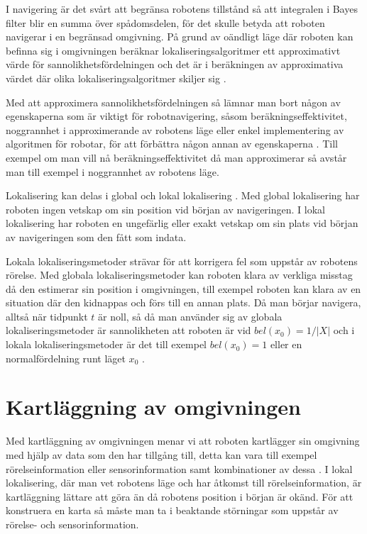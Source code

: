 I navigering är det svårt att begränsa robotens tillstånd så att integralen i Bayes filter blir en summa över spådomsdelen, för det skulle betyda att roboten navigerar i en begränsad omgivning. På grund av oändligt läge där roboten kan befinna sig i omgivningen beräknar lokaliseringsalgoritmer ett approximativt värde för sannolikhetsfördelningen och det är i beräkningen av approximativa värdet där olika lokaliseringsalgoritmer skiljer sig \citep{ProbabilisticRobotics}.

Med att approximera sannolikhetsfördelningen så lämnar man bort någon av egenskaperna som är viktigt för robotnavigering, såsom beräkningseffektivitet, noggrannhet i approximerande av robotens läge eller enkel implementering av algoritmen för robotar, för att förbättra någon annan av egenskaperna \citep{ProbabilisticRobotics}. Till exempel om man vill nå beräkningseffektivitet då man approximerar så avstår man till exempel i noggrannhet av robotens läge.

Lokalisering kan delas i global och lokal lokalisering \citep{982903, globalsubmaps}. Med global lokalisering har roboten ingen vetskap om sin position vid början av navigeringen. I lokal lokalisering har roboten en ungefärlig eller exakt vetskap om sin plats vid början av navigeringen som den fått som indata. 

Lokala lokaliseringsmetoder strävar för att korrigera fel som uppstår av robotens rörelse. Med globala lokaliseringsmetoder kan roboten klara av verkliga misstag då den estimerar sin position i omgivningen, till exempel roboten kan klara av en situation där den kidnappas och förs till en annan plats. Då man börjar navigera, alltså när tidpunkt $t$ är noll, så då man använder sig av globala lokaliseringsmetoder är sannolikheten att roboten är vid $bel(x_0) = 1 / |X|$ och i lokala lokaliseringsmetoder är det till exempel $bel(x_0) = 1$ eller en normalfördelning runt läget $x_0$ \citep{ProbabilisticRobotics}.

\section{Kartläggning av omgivningen} \label{kartlaggning}

Med kartläggning av omgivningen menar vi att roboten kartlägger sin omgivning med hjälp av data som den har tillgång till, detta kan vara till exempel rörelseinformation eller sensorinformation samt kombinationer av dessa \citep{ProbabilisticRobotics}. I lokal lokalisering, där man vet robotens läge och har åtkomst till rörelseinformation, är kartläggning lättare att göra än då robotens position i början är okänd. För att konstruera en karta så måste man ta i beaktande störningar som uppstår av rörelse- och sensorinformation.

